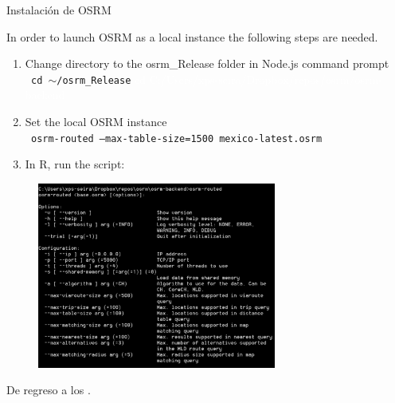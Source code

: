 \documentclass[8pt]{beamer}
\begin{document}
\begin{frame}[allowframebreaks]{Instalación de OSRM}
    
In order to launch OSRM as a local instance the following steps are needed.
    \begin{enumerate}
        \item Change directory to the osrm\_Release folder in  Node.js command prompt\\
        
        \texttt{         cd $\sim$/osrm\_Release}
        \textcolor{white}{      cd C:/Users/xps-seira/Dropbox/repos/osrm/osrm-backend      }

        \item Set the local OSRM instance\\
        
        \texttt{         osrm-routed --max-table-size=1500 mexico-latest.osrm }
        \item In R, run the script:
    \end{enumerate}
    


\framebreak


\begin{figure}[H]
    \begin{center}
        \includegraphics[width=0.7\textwidth]{Figuras/osrm.pdf}
        \end{center}
\end{figure}

De regreso a los \hyperlink{inst}{}.

\end{frame}
\end{document}
